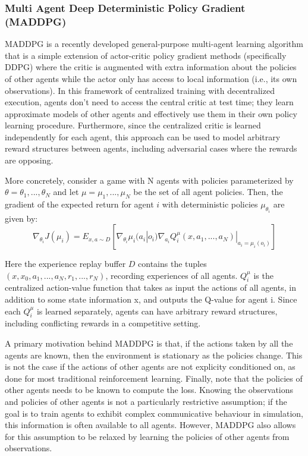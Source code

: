 \subsubsection{Multi Agent Deep Deterministic Policy Gradient (MADDPG)}
MADDPG is a recently developed general-purpose multi-agent learning algorithm that is a simple extension of actor-critic policy gradient methods (specifically DDPG) where the critic is augmented with extra information about the policies of other 
agents while the actor only has access to local information (i.e., its own observations). In this framework of centralized training with decentralized execution, agents don’t need to access the central critic at test time; they learn approximate models of other agents and effectively use them in their own policy learning procedure. Furthermore, since the centralized critic is
learned independently for each agent, this approach can be used to model arbitrary reward structures between agents, including adversarial cases where the rewards are opposing.

More concretely, consider a game with N agents with policies parameterized by $\theta = {\theta_1, ..., \theta_N}$ and let $\mu = {\mu_1, ..., \mu_N}$ be the set of all agent policies. Then, the gradient of the expected return for agent $i$ with deterministic policies $\mu_{\theta_i}$ are given by:
\begin{equation}
\nabla_{\theta_i}J(\mu_i) = E_{x, a \sim D}[\nabla_{\theta_i}\mu_i(a_i|o_i)\nabla_{a_i}Q_i^{\mu}(x, a_1, ..., a_N)|_{a_i = \mu_i(o_i)}]
\end{equation}

Here the experience replay buffer $D$ contains the tuples $(x, x_0, a_1,..., a_N, r_1,..., r_N)$, recording experiences of all agents. $Q^{\mu}_i$ is the centralized action-value function that takes as input the actions of all agents, in addition to some state information x, and outputs the Q-value for agent i. Since each $Q^{\mu}_i$ is learned separately, agents can have 
arbitrary reward structures, including conflicting rewards in a competitive setting.  

A primary motivation behind MADDPG is that, if the actions taken by all the agents are known, then the environment is stationary as the policies change. This is not the case if the actions of other agents are not explicity conditioned on, as done for most traditional reinforcement learning. Finally, note that the policies of other agents needs to be known to compute the loss. Knowing the observations and policies of other agents is not a particularly restrictive assumption; if the goal is to train agents to exhibit complex communicative behaviour in simulation, this information is often available to all agents. However, MADDPG also allows for this assumption to be relaxed by learning the policies of other agents from observations.

